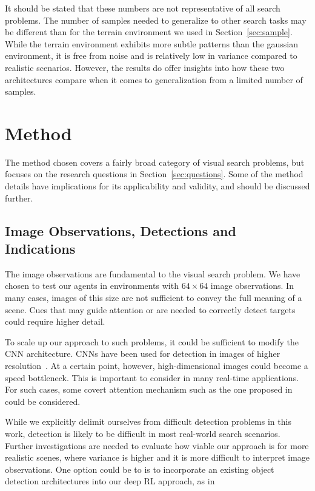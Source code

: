 It should be stated that these numbers are not representative of all search problems.
The number of samples needed to generalize to other search tasks may be different than for the terrain environment we used in Section~\ref{sec:sample}.
While the terrain environment exhibits more subtle patterns than the gaussian environment, it is free from noise and is relatively low in variance compared to realistic scenarios.
However, the results do offer insights into how these two architectures compare when it comes to generalization from a limited number of samples.

\section{Method}
\label{sec:discussion-method}

The method chosen covers a fairly broad category of visual search problems,
but focuses on the research questions in Section~\ref{sec:questions}.
Some of the method details have implications for its applicability and validity, and should be discussed further.

\subsection{Image Observations, Detections and Indications}

The image observations are fundamental to the visual search problem.
We have chosen to test our agents in environments with \(64 \times 64\) image observations.
In many cases, images of this size are not sufficient to convey the full meaning of a scene.
Cues that may guide attention or are needed to correctly detect targets could require higher detail.

To scale up our approach to such problems, it could be sufficient to modify the CNN architecture.
CNNs have been used for detection in images of higher resolution~\cite{zhao_object_2019}.
At a certain point, however, high-dimensional images could become a speed bottleneck.
This is important to consider in many real-time applications.
For such cases, some covert attention mechanism such as the one proposed in~\cite{mnih_recurrent_2014} could be considered.

While we explicitly delimit ourselves from difficult detection problems in this work,
detection is likely to be difficult in most real-world search scenarios.
Further investigations are needed to evaluate how viable our approach is for more realistic scenes,
where variance is higher and it is more difficult to interpret image observations.
One option could be to is to incorporate an existing object detection architectures into our deep RL approach, as in \cite{ye_active_2018}

